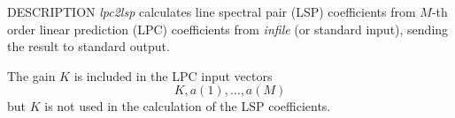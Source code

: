 \begin{synopsis}
\item [lpc2lsp] [ --m $M$ ] [ --s $S$ ] [ --k ] [ --l ] [ --o $O$ ] [ --n $N$ ]
		[ --p $P$ ] [ --q $Q$ ] [ --d $D$ ] 
\item [\ ~~~~~~~~] [ {\em infile} ] 
\end{synopsis}

\begin{qsection}{DESCRIPTION}
{\em lpc2lsp} calculates line spectral pair (LSP) coefficients 
from $M$-th order linear prediction (LPC) coefficients 
from {\em infile} (or standard input),
sending the result to standard output.

The gain $K$ is included in the LPC input vectors
\begin{displaymath}
  K, a(1), \dots, a(M)
\end{displaymath}
but $K$ is not used in the calculation of the LSP coefficients.


\end{qsection}
